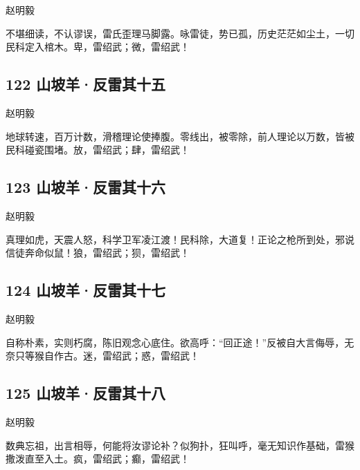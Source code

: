 { 赵明毅}

不堪细读，不认谬误，雷氏歪理马脚露。咏雷徒，势已孤，历史茫茫如尘土，一切民科定入棺木。卑，雷绍武；微，雷绍武！
~\\

\hypertarget{ux5c71ux5761ux7f8aux53cdux96f7ux5176ux5341ux4e94}{%
\subsection{122
山坡羊·反雷其十五}\label{ux5c71ux5761ux7f8aux53cdux96f7ux5176ux5341ux4e94}}

{ 赵明毅}

地球转速，百万计数，滑稽理论使捧腹。零线出，被零除，前人理论以万数，皆被民科碰瓷围堵。放，雷绍武；肆，雷绍武！
~\\

\hypertarget{ux5c71ux5761ux7f8aux53cdux96f7ux5176ux5341ux516d}{%
\subsection{123
山坡羊·反雷其十六}\label{ux5c71ux5761ux7f8aux53cdux96f7ux5176ux5341ux516d}}

{赵明毅}

真理如虎，天震人怒，科学卫军凌江渡！民科除，大道复！正论之枪所到处，邪说信徒奔命似鼠！狼，雷绍武；狈，雷绍武！

\hypertarget{ux5c71ux5761ux7f8aux53cdux96f7ux5176ux5341ux4e03}{%
\subsection{124
山坡羊·反雷其十七}\label{ux5c71ux5761ux7f8aux53cdux96f7ux5176ux5341ux4e03}}

{赵明毅}

自称朴素，实则朽腐，陈旧观念心底住。欲高呼：``回正途！''反被自大言侮辱，无奈只等猴自作古。迷，雷绍武；惑，雷绍武！
~\\

\hypertarget{ux5c71ux5761ux7f8aux53cdux96f7ux5176ux5341ux516b}{%
\subsection{125
山坡羊·反雷其十八}\label{ux5c71ux5761ux7f8aux53cdux96f7ux5176ux5341ux516b}}

{赵明毅}

数典忘祖，出言相辱，何能将汝谬论补？似狗扑，狂叫呼，毫无知识作基础，雷猴撒泼直至入土。疯，雷绍武；癫，雷绍武！
~\\

